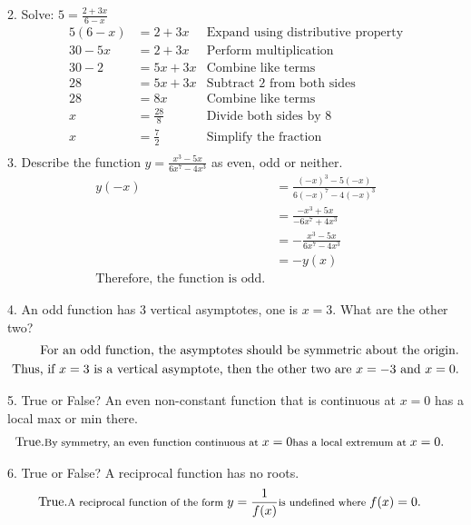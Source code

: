 \documentclass{article}
\newcommand{\smalltext}[1]{\text{\footnotesize #1}}
\begin{document}
2. Solve: \( 5 = \frac{2 + 3x}{6 - x} \)
\begin{align*}
    5(6 - x) &= 2 + 3x & \text{Expand using distributive property} \\
    30 - 5x &= 2 + 3x & \text{Perform multiplication} \\
    30 - 2 &= 5x + 3x & \text{Combine like terms} \\
    28 &= 5x + 3x & \text{Subtract 2 from both sides} \\
    28 &= 8x & \text{Combine like terms} \\
    x &= \frac{28}{8} & \text{Divide both sides by 8} \\
    x &= \frac{7}{2} & \text{Simplify the fraction} \\
\end{align*} 
3. Describe the function \( y=\frac{x^3-5x}{6x^7-4x^3} \) as even, odd or neither.
\begin{align*}
    y(-x) &= \frac{(-x)^3-5(-x)}{6(-x)^7-4(-x)^3} \\
          &= \frac{-x^3+5x}{-6x^7+4x^3} \\
          &= -\frac{x^3-5x}{6x^7-4x^3} \\
          &= -y(x) \\
    \text{Therefore, the function is odd.}
\end{align*}

4. An odd function has 3 vertical asymptotes, one is \( x=3 \). What are the other two?
\begin{align*}
    \text{For an odd function, the asymptotes should be symmetric about the origin.} \\
    \text{Thus, if \( x=3 \) is a vertical asymptote, then the other two are \( x=-3 \) and \( x=0 \).}
\end{align*}

5. True or False? An even non-constant function that is continuous at \( x = 0 \) has a local max or min there.
\begin{align*}
    &\text{True.} \smalltext{ By symmetry, an even function continuous at } x = 0 \smalltext{ has a local extremum at } x = 0.
\end{align*}

6. True or False? A reciprocal function has no roots.
\begin{align*}
    &\text{True.} \smalltext{ A reciprocal function of the form } y = \frac{1}{f(x)} \smalltext{ is undefined where } f(x) = 0.
\end{align*}
\end{document}

